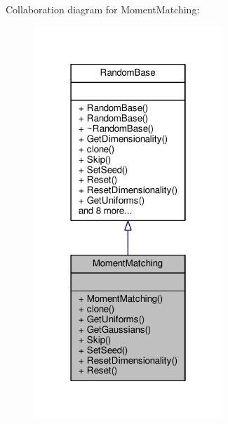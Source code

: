 Collaboration diagram for Moment\+Matching\+:
\nopagebreak
\begin{figure}[H]
\begin{center}
\leavevmode
\includegraphics[width=202pt]{classMomentMatching__coll__graph}
\end{center}
\end{figure}
